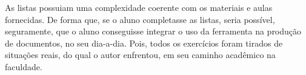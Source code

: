 \documentclass[
12pt,				%
openright,			%
oneside,			%
a4paper,			%
english,			%
french,				%
spanish,			%
brazil,				%
]{abntex2}
\begin{document}
As listas possuiam uma complexidade coerente com os materiais e aulas
fornecidas. De forma que, se o aluno completasse as listas, seria
possível, seguramente, que o aluno conseguisse integrar o uso da
ferramenta na produção de documentos, no seu dia-a-dia. Pois, todos os
exercícios foram tirados de situações reais, do qual o autor
enfrentou, em seu caminho acadêmico na faculdade.




\end{document}
